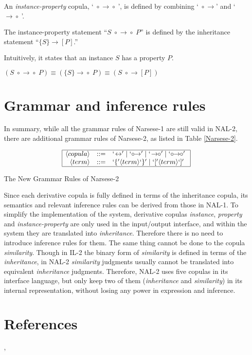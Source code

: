 An {\em instance-property} copula, `$\;\circ\!\!\rightarrow\!\!\circ\;$', is defined by combining `\(\;\circ\!\!\rightarrow\)' and `\(\rightarrow\!\!\circ\;\)'.
\begin{defi}
The instance-property statement ``\(S \;\circ\!\!\rightarrow\!\!\circ\; P\)'' is defined by the inheritance statement ``\(\{S\} \rightarrow [P]\).''
\end{defi}
Intuitively, it states that an instance $S$ has a property $P$.

\begin{theo}
\((S \;\circ\!\!\rightarrow\!\!\circ\; P) \equiv (\{S\} \rightarrow\!\!\circ\; P) \equiv (S \;\circ\!\!\rightarrow [P])\)
\end{theo}

\section{Grammar and inference rules}

In summary, while all the grammar rules of Narsese-1 are still valid in NAL-2, there are additional grammar rules of Narsese-2, as listed in Table \ref{Narsese-2}.

\begin{table}[htb]
\[\begin{array}{|rrl|}
\hline
\langle copula \rangle & ::= & `\!\leftrightarrow' | \; `\circ\!\!\rightarrow' | \; `\!\rightarrow\!\!\circ' \; | \; `\circ\!\!\rightarrow\!\!\circ' \; \\ 
\langle term \rangle  & ::= & `\{' \langle term \rangle `\}' \; | \; `[' \langle  term \rangle `]' \\
\hline
\end{array} \]
\caption{The New Grammar Rules of Narsese-2}
\label{Narsese-2}
\end{table}

Since each derivative copula is fully defined in terms of the inheritance copula, its semantics and relevant inference rules can be derived from those in NAL-1. To simplify the implementation of the system, derivative copulas \emph{instance}, \emph{property} and \emph{instance-property} are only used in the input/output interface, and within the system they are translated into \emph{inheritance}.  Therefore there is no need to introduce inference rules for them.  The same thing cannot be done to the copula \emph{similarity}.  Though in IL-2 the binary form of \emph{similarity} is defined in terms of the \emph{inheritance}, in NAL-2 \emph{similarity} judgments usually cannot be translated into equivalent \emph{inheritance} judgments.  Therefore, NAL-2 uses five copulas in its interface language, but only keep two of them (\emph{inheritance} and \emph{similarity}) in its internal representation, without losing any power in expression and inference. 


\section*{References}

\cite[Chapter 4]{wp:book1}, \cite{wp:nal2,wp:phd,wp:analogy}
